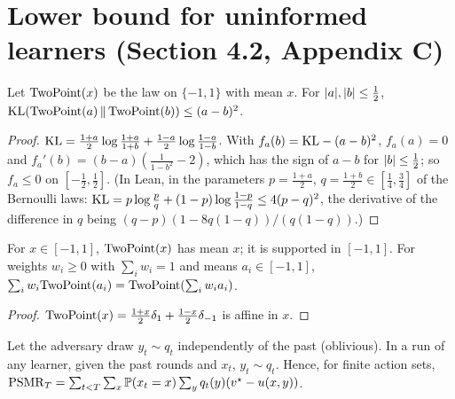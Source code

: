 \chapter{Lower bound for uninformed learners (Section 4.2, Appendix C)}
\label{chap:lower_bound}

\begin{lemma}[Lemma 9]
  \label{lem:kl_bernoulli}
  \leanok
  Let $\mathrm{TwoPoint}(x)$ be the law on $\{-1, 1\}$ with mean $x$. For $\lvert a \rvert, \lvert b \rvert \le \frac12$,
  $\mathrm{KL}(\mathrm{TwoPoint}(a) \,\|\, \mathrm{TwoPoint}(b)) \le (a - b)^2$.
\end{lemma}

\begin{proof}
  \leanok
  $\mathrm{KL} = \frac{1 + a}{2} \log \frac{1 + a}{1 + b} + \frac{1 - a}{2} \log \frac{1 - a}{1 - b}$. With
  $f_a(b) = \mathrm{KL} - (a - b)^2$, $f_a(a) = 0$ and $f_a'(b) = (b - a)(\frac{1}{1 - b^2} - 2)$, which has
  the sign of $a - b$ for $\lvert b \rvert \le \frac12$; so $f_a \le 0$ on $[-\frac12, \frac12]$. (In Lean,
  in the parameters $p = \frac{1 + a}{2}$, $q = \frac{1 + b}{2} \in [\frac14, \frac34]$ of the
  Bernoulli laws: $\mathrm{KL} = p \log \frac pq + (1 - p) \log \frac{1 - p}{1 - q} \le 4 (p - q)^2$, the
  derivative of the difference in $q$ being $(q - p)(1 - 8 q (1 - q)) / (q (1 - q))$.)
\end{proof}

\begin{lemma}
  \label{lem:twopoint_mixture}
  \leanok
  For $x \in [-1, 1]$, $\mathrm{TwoPoint}(x)$ has mean $x$; it is supported in $[-1, 1]$. For weights
  $w_i \ge 0$ with $\sum_i w_i = 1$ and means $a_i \in [-1, 1]$,
  $\sum_i w_i \mathrm{TwoPoint}(a_i) = \mathrm{TwoPoint}(\sum_i w_i a_i)$.
\end{lemma}

\begin{proof}
  \leanok
  $\mathrm{TwoPoint}(x) = \frac{1 + x}{2} \delta_1 + \frac{1 - x}{2} \delta_{-1}$ is affine in $x$.
\end{proof}

\begin{lemma}
  \label{lem:oblivious_adversary}
  \leanok
  Let the adversary draw $y_t \sim q_t$ independently of the past (oblivious). In a run of any
  learner, given the past rounds and $x_t$, $y_t \sim q_t$. Hence, for finite action sets,
  $\mathrm{PSMR}_T = \sum_{t < T} \sum_x \mathbb{P}(x_t = x) \sum_y q_t(y) (v^\star - u(x, y))$.
\end{lemma}

